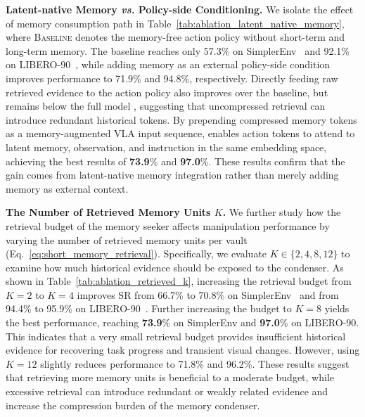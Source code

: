 \noindent\textbf{Latent-native Memory \textit{vs.} Policy-side Conditioning.}
We isolate the effect of memory consumption path in Table~\ref{tab:ablation_latent_native_memory}, where \textsc{Baseline} denotes the memory-free action policy without short-term and long-term memory.
The baseline reaches only 57.3\% on SimplerEnv~\cite{li2025evaluating} and 92.1\% on LIBERO-90~\cite{liu2023libero}, while adding memory as an external policy-side condition improves performance to 71.9\% and 94.8\%, respectively.
Directly feeding raw retrieved evidence to the action policy also improves over the baseline, but remains below the full model \ourmethod, suggesting that uncompressed retrieval can introduce redundant historical tokens.
By prepending compressed memory tokens as a memory-augmented VLA input sequence, \ourmethod enables action tokens to attend to latent memory, observation, and instruction in the same embedding space, achieving the best results of \textbf{73.9}\% and \textbf{97.0}\%.
These results confirm that the gain comes from latent-native memory integration rather than merely adding memory as external context.


\noindent\textbf{The Number of Retrieved Memory Units $K$.}
We further study how the retrieval budget of the memory seeker affects manipulation performance by varying the number of retrieved memory units per vault (Eq.~\ref{eq:short_memory_retrieval}).
Specifically, we evaluate $K \in \{2,4,8,12\}$ to examine how much historical evidence should be exposed to the condenser.
As shown in Table~\ref{tab:ablation_retrieved_k}, increasing the retrieval budget from $K\!=\!2$ to $K\!=\!4$ improves SR from 66.7\% to 70.8\% on SimplerEnv~\cite{li2025evaluating} and from 94.4\% to 95.9\% on LIBERO-90~\cite{liu2023libero}.
Further increasing the budget to $K\!=\!8$ yields the best performance, reaching \textbf{73.9}\% on SimplerEnv and \textbf{97.0}\% on LIBERO-90.
This indicates that a very small retrieval budget provides insufficient historical evidence for recovering task progress and transient visual changes.
However, using $K\!=\!12$ slightly reduces performance to 71.8\% and 96.2\%.
These results suggest that retrieving more memory units is beneficial to a moderate budget, while excessive retrieval can introduce redundant or weakly related evidence and increase the compression burden of the memory condenser.



